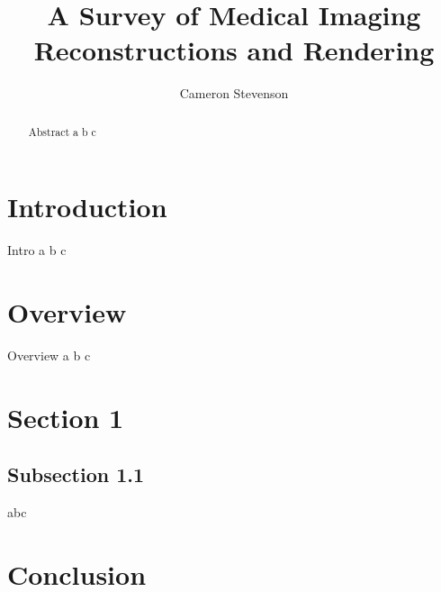 \documentclass[acmsmall]{acmart}
\begin{document}
\title{A Survey of Medical Imaging Reconstructions and Rendering}
\author{Cameron Stevenson}
 
\begin{abstract}
Abstract a b c
\end{abstract}

\maketitle

\section{Introduction}

Intro a b c

\section{Overview}

Overview a b c

\section{Section 1}

\subsection{Subsection 1.1}

abc \cite{mackay2019robust}

\section{Conclusion}



\end{document}
